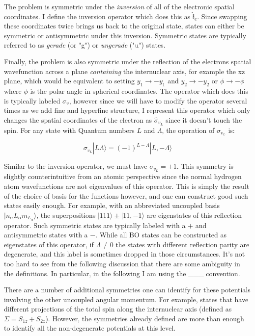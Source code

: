 \documentclass[prl, longbibliography]{revtex4-2}
\begin{document}
The problem is symmetric under the \emph{inversion} of all of the electronic spatial coordinates. 
I define the inversion operator which does this as $\hat{\mathbb{i}}_e$.
Since swapping these coordinates twice brings us back to the original state, states can either be symmetric or antisymmetric under this inversion. 
Symmetric states are typically referred to as \emph{gerade} (or "g") or \emph{ungerade} ("u") states. 

Finally, the problem is also symmetric under the reflection of the electrons spatial wavefunction across a plane \emph{containing} the internuclear axis, for example the xz plane, which would be equivalent to setting $y_1\rightarrow -y_1$ and $y_2\rightarrow-y_2$ or $\phi\rightarrow -\phi$ where $\phi$ is the polar angle in spherical coordinates.
The operator which does this is typically labeled $\sigma_v$, however since we will have to modify the operator several times as we add fine and hyperfine structure, I represent this operator which only changes the spatial coordinates of the electron as $\hat{\sigma}_{v_L}$ since it doesn't touch the spin. For any state with Quantum numbers $L$ and $\Lambda$, the operation of $\sigma_{v_L}$ is:

$$
\sigma_{v_L}|L\Lambda\rangle = (-1)^{L-\Lambda}|L,-\Lambda\rangle
$$

Similar to the inversion operator, we must have $\sigma _{v_L}=\pm 1$. This symmetry is slightly counterintuitive from an atomic perspective since the normal hydrogen atom wavefunctions are not eigenvalues of this operator. 
This is simply the result of the choice of basis for the functions however, and one can construct good such states easily enough. For example, with an abbreviated uncoupled basis $|n_\alpha L_\alpha m_{L_\alpha}\rangle$, the superpositions $|111\rangle \pm |11,-1\rangle$ are eigenstates of this reflection operator.
Such symmetric states are typically labeled with a $+$ and antisymmetric states with a $-$. While all BO states can be constructed as eigenstates of this operator, if $\Lambda\ne 0$ the states with different reflection parity are degenerate, and this label is sometimes dropped in those circumstances.
It's not too hard to see from the following discussion that there are some ambiguity in the definitions. In particular, in the following I am using the \_\_\_ convention.

There are a number of additional symmetries one can identify for these potentials involving the other uncoupled angular momentum. For example, states that have different projections of the total spin along the internuclear axis (defined as $\Sigma=S_{1z}+S_{2z}$). However, the symmetries already defined are more than enough to identify all the non-degenerate potentials at this level.
\end{document}
